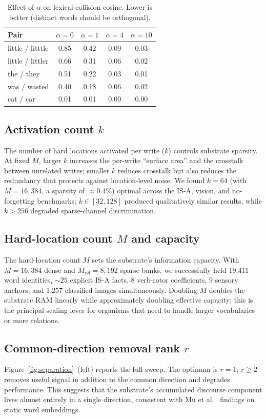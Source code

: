 \documentclass[11pt,a4paper]{article}
\begin{document}
\begin{table}[t]
  \centering
  \caption{Effect of $\alpha$ on lexical-collision cosine.  Lower is
  better (distinct words should be orthogonal).}
  \label{tab:wordweight}
  \begin{tabular}{lcccc}
    \toprule
    Pair & $\alpha=0$ & $\alpha=1$ & $\alpha=4$ & $\alpha=10$ \\
    \midrule
    little / litttle & 0.85 & 0.42 & 0.09 & 0.03 \\
    little / littler & 0.66 & 0.31 & 0.06 & 0.02 \\
    the / they       & 0.51 & 0.22 & 0.03 & 0.01 \\
    was / wasted     & 0.40 & 0.18 & 0.06 & 0.02 \\
    cat / car        & 0.01 & 0.01 & 0.00 & 0.00 \\
    \bottomrule
  \end{tabular}
\end{table}

\subsection{Activation count $k$}
The number of hard locations activated per write ($k$) controls
substrate sparsity.  At fixed $M$, larger $k$ increases the per-write
``surface area'' and the crosstalk between unrelated writes; smaller
$k$ reduces crosstalk but also reduces the redundancy that protects
against location-level noise.  We found $k = 64$ (with $M = 16{,}384$,
a sparsity of $\approx 0.4\%$) optimal across the IS-A, vision, and
no-forgetting benchmarks;  $k \in [32, 128]$ produced qualitatively
similar results, while $k > 256$ degraded sparse-channel discrimination.

\subsection{Hard-location count $M$ and capacity}
The hard-location count $M$ sets the substrate's information capacity.
With $M = 16{,}384$ dense and $M_{\mathrm{rel}} = 8{,}192$ sparse banks,
we successfully held 19{,}411 word identities, $\sim 25$ explicit IS-A
facts, 8 verb-rotor coefficients, 9 sensory anchors, and 1{,}257
classified images simultaneously.  Doubling $M$ doubles the substrate
RAM linearly while approximately doubling effective capacity;  this is
the principal scaling lever for organisms that need to handle larger
vocabularies or more relations.

\subsection{Common-direction removal rank $r$}
Figure~\ref{fig:separation}~(left) reports the full sweep.  The
optimum is $r = 1$;  $r \geq 2$ removes useful signal in addition to
the common direction and degrades performance.  This suggests that
the substrate's accumulated discourse component lives almost entirely
in a single direction, consistent with Mu et al.\ \cite{mu2017all}
findings on static word embeddings.
\end{document}
